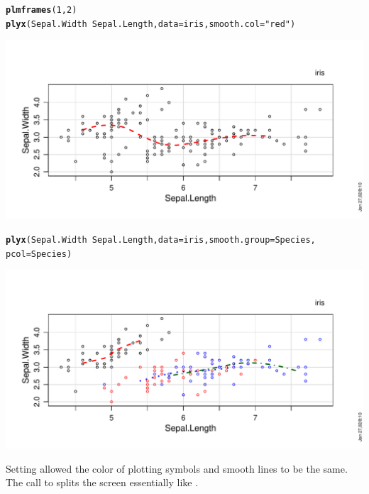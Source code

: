\documentclass[11pt]{article}\usepackage[]{graphicx}\usepackage[]{color}
\makeatletter
\def\maxwidth{ %
  \ifdim\Gin@nat@width>\linewidth
    \linewidth
  \else
    \Gin@nat@width
  \fi
}
\newcommand{\hlnum}[1]{\textcolor[rgb]{0.686,0.059,0.569}{#1}}%
\newcommand{\hlstr}[1]{\textcolor[rgb]{0.192,0.494,0.8}{#1}}%
\newcommand{\hlopt}[1]{\textcolor[rgb]{0,0,0}{#1}}%
\newcommand{\hlstd}[1]{\textcolor[rgb]{0.345,0.345,0.345}{#1}}%
\newcommand{\hlkwc}[1]{\textcolor[rgb]{0.333,0.667,0.333}{#1}}%
\newcommand{\hlkwd}[1]{\textcolor[rgb]{0.737,0.353,0.396}{\textbf{#1}}}%
\newenvironment{kframe}{%
 \def\at@end@of@kframe{}%
 \ifinner\ifhmode%
  \def\at@end@of@kframe{\end{minipage}}%
  \begin{minipage}{\columnwidth}%
 \fi\fi%
 \def\FrameCommand##1{\hskip\@totalleftmargin \hskip-\fboxsep
 \colorbox{shadecolor}{##1}\hskip-\fboxsep
     \hskip-\linewidth \hskip-\@totalleftmargin \hskip\columnwidth}%
 \MakeFramed {\advance\hsize-\width
   \@totalleftmargin\z@ \linewidth\hsize
   \@setminipage}}%
 {\par\unskip\endMakeFramed%
 \at@end@of@kframe}
\newenvironment{knitrout}{}{} %
\makeatother
\begin{document}
\begin{knitrout}
\color{fgcolor}\begin{kframe}
\begin{alltt}
\hlkwd{plmframes}\hlstd{(}\hlnum{1}\hlstd{,}\hlnum{2}\hlstd{)}
\hlkwd{plyx}\hlstd{(Sepal.Width}\hlopt{~}\hlstd{Sepal.Length,} \hlkwc{data}\hlstd{=iris,} \hlkwc{smooth.col}\hlstd{=}\hlstr{"red"}\hlstd{)}
\end{alltt}
\end{kframe}
\includegraphics[width=\maxwidth]{figure/plyx_smooth-1} 
\begin{kframe}\begin{alltt}
\hlkwd{plyx}\hlstd{(Sepal.Width}\hlopt{~}\hlstd{Sepal.Length,} \hlkwc{data}\hlstd{=iris,} \hlkwc{smooth.group}\hlstd{=Species,}
     \hlkwc{pcol}\hlstd{=Species)}
\end{alltt}
\end{kframe}
\includegraphics[width=\maxwidth]{figure/plyx_smooth-2} 

\end{knitrout}
Setting  allowed the color of plotting symbols and smooth
lines to be the same.
The call to  splits the screen essentially like 
.
\end{document}
